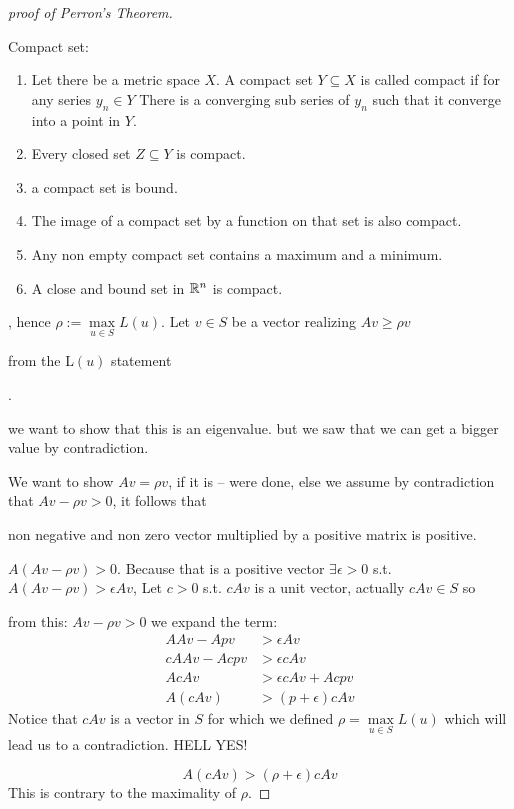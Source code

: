 \begin{proof}[proof of Perron's Theorem]
\begin{insight}
Compact set:
\begin{enumerate}
\item Let there be a metric space $X$. A compact set $Y\subseteq X$ is
called compact if for any series $y_{n}\in Y$ There is a converging
sub series of $y_{n}$ such that it converge into a point in $Y$.
\item Every closed set $Z\subseteq Y$ is compact.
\item a compact set is bound.
\item The image of a compact set by a function on that set is also compact.
\item Any non empty compact set contains a maximum and a minimum.
\item A close and bound set in $\mathbb{R}^{n}$ is compact.
\end{enumerate}
\end{insight}
, hence $\rho:=\max\limits _{u\in S}L\left(u\right)$. Let $v\in S$
be a vector realizing $Av\ge\rho v$%
\begin{insight}
from the L$\left(u\right)$ statement%
\end{insight}
. %
\begin{insight}
we want to show that this is an eigenvalue. but we saw that we can
get a bigger value by contradiction.%
\end{insight}
We want to show $Av=\rho v$, if it is -- were done, else we assume
by contradiction that $Av-\rho v>0$, it follows that %
\begin{insight}
non negative and non zero vector multiplied by a positive matrix is
positive.%
\end{insight}
$A\left(Av-\rho v\right)>0$. Because that is a positive vector $\exists\epsilon>0$
s.t. $A\left(Av-\rho v\right)>\epsilon Av$, Let $c>0$ s.t. $cAv$
is a unit vector, actually $cAv\in S$ so%
\begin{insight}
from this: $Av-\rho v>0$ we expand the term:
\begin{align*}
AAv-Apv & >\epsilon Av\\
cAAv-Acpv & >\epsilon cAv\\
AcAv & >\epsilon cAv+Acpv\\
A\left(cAv\right) & >\left(p+\epsilon\right)cAv
\end{align*}
 Notice that $cAv$ is a vector in $S$ for which we defined $\rho=\max\limits _{u\in S}L\left(u\right)$
which will lead us to a contradiction. HELL YES!%
\end{insight}
\[
A\left(cAv\right)>\left(\rho+\epsilon\right)cAv
\]
{} This is contrary to the maximality of $\rho$.

\end{proof}
